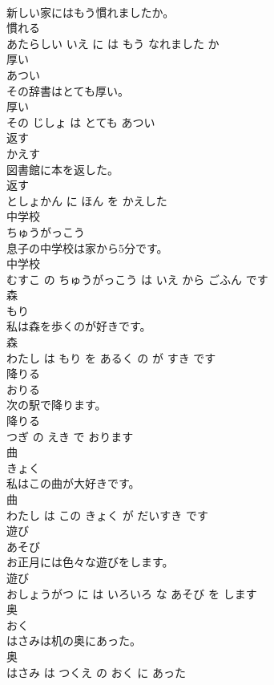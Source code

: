 \documentclass[8pt]{extreport}
\begin{document}
\begin{CJK}{UTF8}{min}
\\	新しい家にはもう慣れましたか。	
\\	慣れる 
\\	あたらしい いえ に は もう なれました か			
\\	厚い	
\\	あつい			
\\	その辞書はとても厚い。	
\\	厚い 
\\	その じしょ は とても あつい			
\\	返す	
\\	かえす			
\\	図書館に本を返した。	
\\	返す 
\\	としょかん に ほん を かえした			
\\	中学校	
\\	ちゅうがっこう			
\\	息子の中学校は家から5分です。	
\\	中学校 
\\	むすこ の ちゅうがっこう は いえ から ごふん です			
\\	森	
\\	もり			
\\	私は森を歩くのが好きです。	
\\	森 
\\	わたし は もり を あるく の が すき です			
\\	降りる	
\\	おりる			
\\	次の駅で降ります。	
\\	降りる 
\\	つぎ の えき で おります			
\\	曲	
\\	きょく			
\\	私はこの曲が大好きです。	
\\	曲 
\\	わたし は この きょく が だいすき です			
\\	遊び	
\\	あそび			
\\	お正月には色々な遊びをします。	
\\	遊び 
\\	おしょうがつ に は いろいろ な あそび を します			
\\	奥	
\\	おく			
\\	はさみは机の奥にあった。	
\\	奥 
\\	はさみ は つくえ の おく に あった			

\end{CJK}
\end{document}
